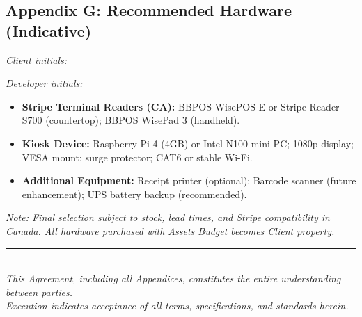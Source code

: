 \documentclass[11pt, a4paper]{article}
\begin{document}
\subsection*{Appendix G: Recommended Hardware (Indicative)}
\label{appendix:hardware}
\noindent
\begin{minipage}[t]{0.45\textwidth}
\textit{Client initials: }\TextField[name=init_client_G,width=1.6cm,bordercolor={0.7 0.7 0.7}]{}
\end{minipage}%
\hfill%
\begin{minipage}[t]{0.45\textwidth}
\raggedleft
\textit{Developer initials: }\TextField[name=init_dev_G,width=1.6cm,bordercolor={0.7 0.7 0.7}]{}
\end{minipage}
\vspace{0.3cm}
\begin{itemize}[leftmargin=*]
\item \textbf{Stripe Terminal Readers (CA):} BBPOS WisePOS E or Stripe Reader S700 (countertop); BBPOS WisePad 3 (handheld).
\item \textbf{Kiosk Device:} Raspberry Pi 4 (4GB) or Intel N100 mini-PC; 1080p display; VESA mount; surge protector; CAT6 or stable Wi-Fi.
\item \textbf{Additional Equipment:} Receipt printer (optional); Barcode scanner (future enhancement); UPS battery backup (recommended).
\end{itemize}
\textit{Note: Final selection subject to stock, lead times, and Stripe compatibility in Canada. All hardware purchased with Assets Budget becomes Client property.}

\vspace{2cm}
\begin{center}
\rule{0.5\textwidth}{0.5pt}\\
\vspace{0.5cm}
{\small\textit{This Agreement, including all Appendices, constitutes the entire understanding between parties.\\
Execution indicates acceptance of all terms, specifications, and standards herein.}}
\end{center}

\label{LastPage}
\end{document}
